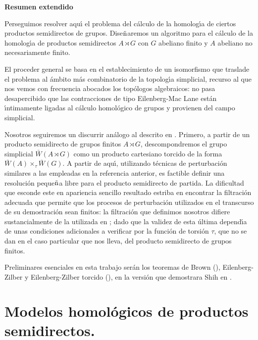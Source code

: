 \begin{center}
{\bf Resumen extendido}
\end{center}

Perseguimos resolver aqu\'{\i} el problema del
c\'{a}lculo de la homolog\'{\i}a de ciertos productos semidirectos
de grupos. Dise${\tilde{\mbox{n}}}$aremos un algoritmo para el c\'{a}lculo de la
homolog\'{\i}a de productos semidirectos $A \rtimes G$ con $G$
abeliano finito y $A$ abeliano no necesariamente finito.

El proceder general se basa en el establecimiento de un isomorfismo que
traslade el problema al \'{a}mbito m\'{a}s combinatorio de la topolog\'{\i}a
simplicial, recurso al que nos vemos con frecuencia abocados los top\'{o}logos
algebraicos: no pasa desapercibido que las contracciones de tipo
Eilenberg-Mac Lane est\'{a}n \'{\i}ntimamente ligadas al c\'{a}lculo
homol\'{o}gico de grupos y provienen del campo simplicial.

Nosotros seguiremos un discurrir an\'{a}logo al descrito en \cite{LS87}. Primero, a partir de
un producto semidirecto de grupos finitos $A \rtimes G$, descompondremos
el grupo simplicial $\bar{W}(A \rtimes G)$ como un producto
cartesiano torcido de la forma
$\bar{W}(A)\times_{\tau}\bar{W}(G)$. A partir de aqu\'{\i},
utilizando t\'{e}cnicas de perturbaci\'{o}n similares a las empleadas
en la referencia anterior, es factible definir una resoluci\'{o}n peque${\tilde{\mbox{n}}}$a
libre para el producto semidirecto de partida. La dificultad que
esconde este en apariencia sencillo resultado estriba en encontrar
la filtraci\'{o}n adecuada que permite que los procesos de
perturbaci\'{o}n utilizados en el transcurso de su demostraci\'{o}n
sean finitos: la filtraci\'{o}n que definimos nosotros difiere
sustancialmente de la utilizada en \cite{LS87}; dado que la
validez de esta \'{u}ltima depend\'{\i}a de unas condiciones
adicionales a verificar por la funci\'{o}n de torsi\'{o}n $\tau$, que
no se dan en el caso particular que nos lleva, del producto
semidirecto de grupos finitos.

Preliminares esenciales en esta trabajo ser\'{a}n los teoremas de
Brown (\cite{Bro59,Bro64}), Eilenberg-Zilber y Eilenberg-Zilber
torcido (\cite{EM54,EZ59}), en la versi\'{o}n que demostrara Shih en
\cite{Shi61}.

\section{Modelos homol\'{o}gicos de productos semidirectos.}


